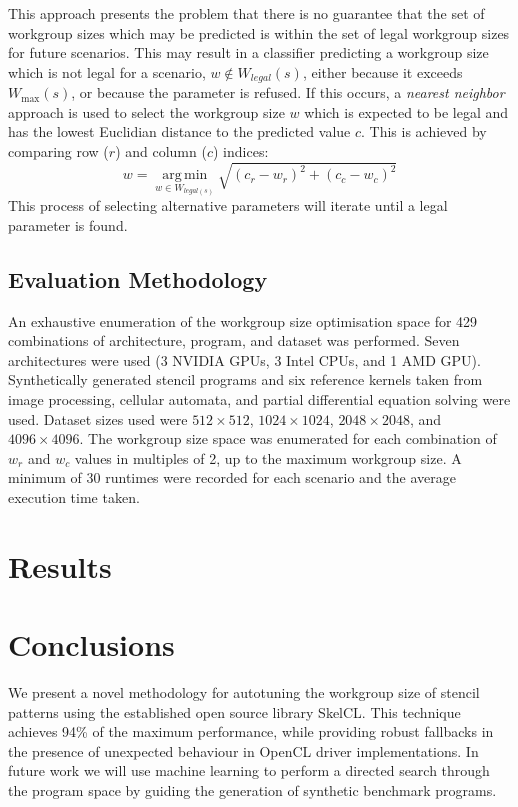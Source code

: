 \documentclass[hidelinks]{acaces}
\DeclareMathOperator*{\argmin}{arg\,min}
\begin{document}
This approach presents the problem that there is no guarantee that the
set of workgroup sizes which may be predicted is within the set of
legal workgroup sizes for future scenarios. This may result in a
classifier predicting a workgroup size which is not legal for a
scenario, $w \not\in W_{legal}(s)$, either because it exceeds
$W_{\max}(s)$, or because the parameter is refused. If this occurs, a
\emph{nearest neighbor} approach is used to select the workgroup size
$w$ which is expected to be legal and has the lowest Euclidian
distance to the predicted value $c$. This is achieved by comparing row
($r$) and column ($c$) indices:
%
\begin{equation}
  w = \underset{w \in W_{legal(s)}}{\argmin} \sqrt{\left(c_r - w_r\right)^2 + \left(c_c - w_c\right)^2}
\end{equation}
%
This process of selecting alternative parameters will iterate until a
legal parameter is found.

\subsection{Evaluation Methodology}

An exhaustive enumeration of the workgroup size optimisation space for
429 combinations of architecture, program, and dataset was performed.
Seven architectures were used (3 NVIDIA GPUs, 3 Intel CPUs, and 1 AMD
GPU). Synthetically generated stencil programs and six reference
kernels taken from image processing, cellular automata, and partial
differential equation solving were used. Dataset sizes used were
$512\times512$, $1024\times1024$, $2048\times2048$, and
$4096\times4096$. The workgroup size space was enumerated for each
combination of $w_r$ and $w_c$ values in multiples of 2, up to the
maximum workgroup size. A minimum of 30 runtimes were recorded for
each scenario and the average execution time taken.

\section{Results}\label{sec:results}

\section{Conclusions}\label{sec:conclusions}

We present a novel methodology for autotuning the workgroup size of
stencil patterns using the established open source library
SkelCL. This technique achieves 94\% of the maximum performance, while
providing robust fallbacks in the presence of unexpected behaviour in
OpenCL driver implementations. In future work we will use machine
learning to perform a directed search through the program space by
guiding the generation of synthetic benchmark programs.


\label{bibliography}

\begingroup
{}
\setlength\bibitemsep{1pt}
\printbibliography
\endgroup
\end{document}
